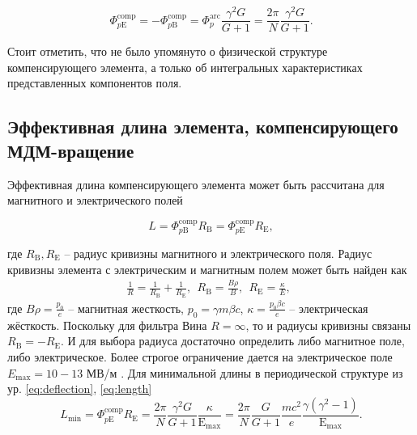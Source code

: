\begin{equation}
	\Phi_{p\mathrm{E}}^{\textrm{comp}} = - \Phi_{p\mathrm{B}}^{\textrm{comp}} = {\Phi}_{p}^{\text{arc}}\frac{\gamma^2 G}{G+1} =\frac{2\pi}{N}\frac{\gamma^2 G}{G+1}.
	\label{eq:deflection}
\end{equation}

\noindent Стоит отметить, что не было упомянуто о физической структуре компенсирующего элемента, а только об интегральных характеристиках представленных компонентов поля.

	\subsection{Эффективная длина элемента, компенсирующего МДМ-вращение}\label{sec:EDM/requirements/length}
	
\par Эффективная длина компенсирующего элемента может быть рассчитана для магнитного и электрического полей

\begin{equation}
	L = \Phi_{p\mathrm{B}}^{\text{comp}}R_{\mathrm{B}} = \Phi_{p\mathrm{E}}^{\text{comp}}R_{\mathrm{E}},
	\label{eq:length}
\end{equation}

\noindent где $R_{\mathrm{B}}, R_{\mathrm{E}}$ -- радиус кривизны магнитного и электрического поля. Радиус кривизны элемента с электрическим и магнитным полем может быть найден как
\begin{equation}
	\begin{gathered}
		\frac{1}{R}  = \frac{1}{R_\textrm{B}}+\frac{1}{R_\textrm{E}}, \ \ 
		R_\textrm{B}  = \frac{B\rho}{B}, \ \ 
		R_\textrm{E}  = \frac{\kappa}{E}, \ \ 
	\end{gathered}
\end{equation}
где $B\rho=\frac{p_0}{e}$ – магнитная жесткость, $p_0=\gamma m\beta c$, $\kappa=\frac{p_0\beta c}{e}$ – электрическая жёсткость.
Поскольку для фильтра Вина $R=\infty$, то и радиусы кривизны связаны $R_{\textrm{B}}=-R_{\textrm{E}}$. И для выбора радиуса достаточно определить либо магнитное поле, либо электрическое. Более строгое ограничение дается на электрическое поле $E_{\textrm{max}}=10-13$ МВ/м \cite{Wien}. Для минимальной длины в периодической структуре из ур. \ref{eq:deflection}, \ref{eq:length} 
\begin{equation}
		L_{\text{min}} = \Phi_{p\mathrm{E}}^{\text{comp}}R_{\mathrm{E}}=
		\frac{2\pi}{N}\frac{\gamma^2 G}{G+1}\frac{\kappa}{\mathrm{E}_{\text{max}}}
		 = \frac{2\pi}{N}\frac{G}{G+1}\frac{mc^2}{e}\frac{\gamma(\gamma^2-1)}{\mathrm{E}_{\text{max}}}.
		\label{eq:length_min}
\end{equation}


